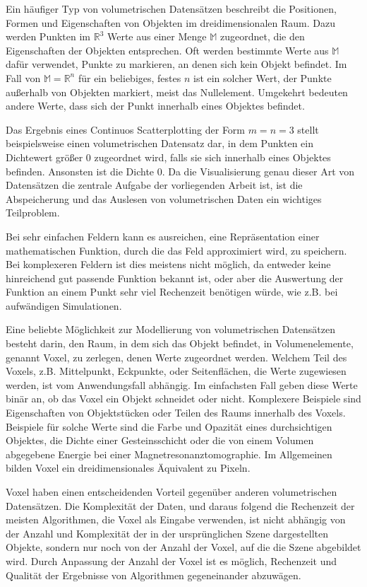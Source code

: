 \documentclass[a4paper,fontsize=12pt,toc=bib,parskip=half,ngerman]{scrartcl}
\begin{document}
Ein h\"aufiger Typ von volumetrischen Datens\"atzen beschreibt die Positionen, Formen und Eigenschaften von Objekten im dreidimensionalen Raum. Dazu werden Punkten im $\mathbb{R}^3$ Werte aus einer Menge $\mathbb{M}$ zugeordnet, die den Eigenschaften der Objekten entsprechen. Oft werden bestimmte Werte aus $\mathbb{M}$ daf\"ur verwendet, Punkte zu markieren, an denen sich kein Objekt befindet. Im Fall von $\mathbb{M} = \mathbb{R}^n$ f\"ur ein beliebiges, festes $n$ ist ein solcher Wert, der Punkte au{\ss}erhalb von Objekten markiert, meist das Nullelement. Umgekehrt bedeuten andere Werte, dass sich der Punkt innerhalb eines Objektes befindet.

Das Ergebnis eines Continuos Scatterplotting der Form $m=n=3$ stellt beispielsweise einen volumetrischen Datensatz dar, in dem Punkten ein Dichtewert gr\"o{\ss}er 0 zugeordnet wird, falls sie sich innerhalb eines Objektes befinden. Ansonsten ist die Dichte 0. Da die Visualisierung genau dieser Art von Datens\"atzen die zentrale Aufgabe der vorliegenden Arbeit ist, ist die Abspeicherung und das Auslesen von volumetrischen Daten ein wichtiges Teilproblem.

Bei sehr einfachen Feldern kann es ausreichen, eine Repr\"asentation einer mathematischen Funktion, durch die das Feld approximiert wird, zu speichern. Bei komplexeren Feldern ist dies meistens nicht m\"oglich, da entweder keine hinreichend gut passende Funktion bekannt ist, oder aber die Auswertung der Funktion an einem Punkt sehr viel Rechenzeit ben\"otigen w\"urde, wie z.B. bei aufw\"andigen Simulationen. 

Eine beliebte M\"oglichkeit zur Modellierung von volumetrischen Datens\"atzen besteht darin, den Raum, in dem sich das Objekt befindet, in Volumenelemente, genannt \glq Voxel\grq{}, zu zerlegen, denen Werte zugeordnet werden. Welchem Teil des Voxels, z.B. Mittelpunkt, Eckpunkte, oder Seitenfl\"achen, die Werte zugewiesen werden, ist vom Anwendungsfall abh\"angig. Im einfachsten Fall geben diese Werte bin\"ar an, ob das Voxel ein Objekt schneidet oder nicht. Komplexere Beispiele sind Eigenschaften von Objektst\"ucken oder Teilen des Raums innerhalb des Voxels. Beispiele f\"ur solche Werte sind die Farbe und Opazit\"at eines durchsichtigen Objektes, die Dichte einer Gesteinsschicht oder die von einem Volumen abgegebene Energie bei einer Magnetresonanztomographie. Im Allgemeinen bilden Voxel ein dreidimensionales \"Aquivalent zu Pixeln.

Voxel haben einen entscheidenden Vorteil gegen\"uber anderen volumetrischen Datens\"atzen. Die Komplexit\"at der Daten, und daraus folgend die Rechenzeit der meisten Algorithmen, die Voxel als Eingabe verwenden, ist nicht abh\"angig von der Anzahl und Komplexit\"at der in der urspr\"unglichen Szene dargestellten Objekte, sondern  nur noch von der Anzahl der Voxel, auf die die Szene abgebildet wird. Durch Anpassung der Anzahl der Voxel ist es m\"oglich, Rechenzeit und Qualit\"at der Ergebnisse von Algorithmen gegeneinander abzuw\"agen.
\end{document}
